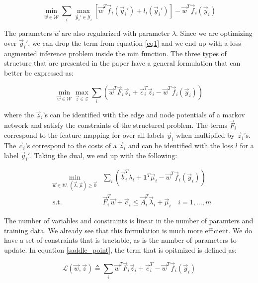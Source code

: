 \begin{equation}
  \min_{\vec w \in \mathcal{W}} \sum_i \max_{\vec y_i' \in \mathcal{Y}_i} \left[
\vec w^T \vec f_i(\vec y_i') + l_i(\vec y_i') \right] - \vec w^T \vec f_i(\vec
y_i)
\end{equation}

The parameters $\vec w$ are also regularized with parameter $\lambda$. Since we are
optimizing over $\vec y_i'$, we can drop the term from equation \ref{eq1} and we end
up with a loss-augmented inference problem inside the min function. The three
types of structure that are presented in the paper have a general formulation
that can better be expressed as:

\begin{equation}
  \min_{\vec w \in \mathcal{W}} \max_{\vec z \in \mathcal{Z}} \sum_i \left( \vec
w^T \vec F_i \vec z_i + \vec c_i^T \vec z_i - \vec w^T \vec f_i(\vec y_i)
\right)
  \label{saddle_point}
\end{equation}

where the $\vec z_i$'s can be identified with the edge and node potentials of a
markov network and satisfy the constraints of the structured problem. The terms
$\vec F_i$ correspond to the feature mapping for over all labels $\vec y_i$ when
multiplied by $\vec z_i$'s. The $\vec c_i$'s correspond to the costs of a $\vec z_i$ and can be
identified with the loss $l$ for a label $\vec y_i'$. Taking the dual, we end up with
the following:

\begin{align}
    &\min_{\vec w \in \mathcal{W}, (\vec \lambda,\vec \mu) \geq \vec 0} &\sum_i
\left( \vec b_i^T \lambda_i + \mathbf{1}^T \vec \mu_i - \vec w^T \vec f_i(\vec
y_i) \right)\\ &\text{s.t.} &\vec F_i^T \vec w + \vec c_i \leq \vec A_i^T \vec
\lambda_i + \vec \mu_i \quad i=1,\dots,m
\end{align}

The number of variables and constraints is linear in the number of paramters and
training data. We already see that this formulation is much more efficient. We
do have a set of constraints that is tractable, as is the number of parameters
to update. In equation \ref{saddle_point}, the term that is opitmized is defined
as:

\begin{equation}
  \mathcal{L}(\vec w,\vec z) \triangleq \sum_i \vec w^T \vec F_i \vec z_i + \vec
c_i^T - \vec w^T \vec f_i(\vec y_i)
  \label{saddle_obj}
\end{equation}

